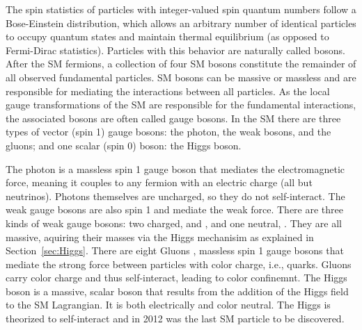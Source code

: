 The spin statistics of particles with integer-valued spin quantum numbers follow a Bose-Einstein distribution, which allows an arbitrary number of identical particles to occupy quantum states and maintain thermal equilibrium (as opposed to Fermi-Dirac statistics). Particles with this behavior are naturally called bosons. After the SM fermions, a collection of four SM bosons constitute the remainder of all observed fundamental particles. SM bosons can be massive or massless and are responsible for mediating the interactions between all particles. As the local gauge transformations of the SM are responsible for the fundamental interactions, the associated bosons are often called gauge bosons. In the SM there are three types of vector (spin 1) gauge bosons: the photon, the weak bosons, and the gluons; and one scalar (spin 0) boson: the Higgs boson. 

The photon \Pgamma is a massless spin 1 gauge boson that mediates the electromagnetic force, meaning it couples to any fermion with an electric charge (all but neutrinos). Photons themselves are uncharged, so they do not self-interact. The weak gauge bosons are also spin 1 and mediate the weak force. There are three kinds of weak gauge bosons: two charged, \PWplus and \PWminus, and one neutral, \PZzero. They are all massive, aquiring their masses via the Higgs mechanisim as explained in Section~\ref{sec:Higgs}. There are eight Gluons \Pgluon, massless spin 1 gauge bosons that mediate the strong force between particles with color charge, i.e., quarks. Gluons carry color charge and thus self-interact, leading to color confinemnt. The Higgs boson \PHiggsheavyzero is a massive, scalar boson that results from the addition of the Higgs field to the SM Lagrangian. It is both electrically and color neutral. The Higgs is theorized to self-interact and in 2012 was the last SM particle to be discovered. 
